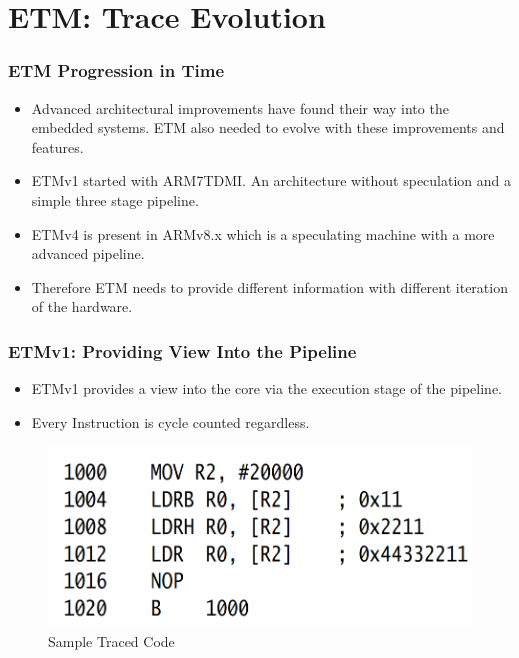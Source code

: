 \documentclass{beamer}
\begin{document}
\section{ETM: Trace Evolution}
\begin{frame}
    \frametitle{ETM Progression in Time}
    \begin{itemize}
        \item Advanced architectural improvements have found their way
            into the embedded systems. ETM also needed to evolve with these
            improvements and features.
        \item ETMv1 started with ARM7TDMI. An architecture without speculation
            and a simple three stage pipeline.
        \item ETMv4 is present in ARMv8.x which is a speculating machine with
            a more advanced pipeline.
        \item Therefore ETM needs to provide different information with
            different iteration of the hardware.
    \end{itemize}
\end{frame}
\begin{frame}
    \frametitle{ETMv1: Providing View Into the Pipeline}
    \begin{itemize}
        \item ETMv1 provides a view into the core via the execution stage of
            the pipeline.
        \item Every Instruction is cycle counted regardless.
    \end{itemize}
    \begin{figure}
        \centering
        \includegraphics[width=0.80\columnwidth]{etmv11.png}
        \caption{Sample Traced Code}
        \label{fig:ETMv11}
    \end{figure}
\end{frame}
\end{document}
